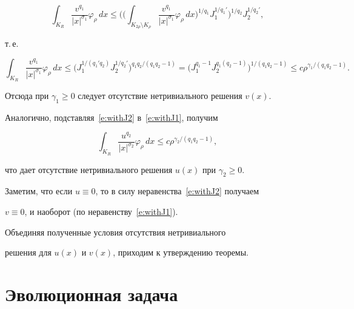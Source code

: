 \begin{pf}
$$


\int_{K_R}\frac{v^{q_1}}{|x|^{\sigma_1}}\varphi_\rho\,dx


\le


\Bigg(


\bigg(\int_{K_{2\rho}\setminus K_\rho}


\frac{v^{q_1}}{|x|^{\sigma_1}}\varphi_\rho\,dx


\bigg)^{1/q_1} J_1^{1/q_1'} \Bigg)^{1/q_2} J_2^{1/q_2'},


$$


т.\,е.


$$


\int_{K_R}\frac{v^{q_1}}{|x|^{\sigma_1}}\varphi_\rho\,dx


\le


\big(J_1^{1/(q_1'q_2)}J_2^{1/q_2'}\big)^{q_1q_2/(q_1q_2-1)}=


\big(J_1^{q_1-1}J_2^{q_1(q_2-1)}\big)^{1/(q_1q_2-1)}\le


c\rho^{\gamma_1/(q_1q_2-1)}.


$$


Отсюда при $\gamma_1\ge0$ следует отсутствие нетривиального решения $v(x)$.


Аналогично, подставляя~\eqref{e:withJ2} в~\eqref{e:withJ1}, получим


$$


\int_{K_R}\frac{u^{q_2}}{|x|^{\sigma_2}}\varphi_\rho\,dx


\le c\rho^{\gamma_2/(q_1q_2-1)},


$$


что дает отсутствие нетривиального решения $u(x)$ при $\gamma_2\ge0$.





Заметим, что если $u\equiv0$, то в силу неравенства~\eqref{e:withJ2} получаем


$v\equiv0$, и наоборот (по неравенству~\eqref{e:withJ1}).


Объединяя полученные условия отсутствия нетривиального


решения для $u(x)$ и $v(x)$, приходим к утверждению теоремы.


\end{pf}








\section{Эволюционная задача}





